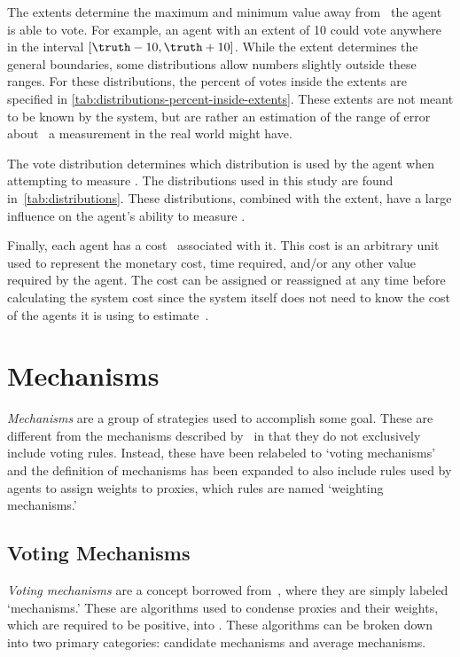 The extents determine the maximum and minimum value away from \truth\ the
agent is able to vote.
For example, an agent with an extent of 10 could vote anywhere in the
interval $[\truth - 10, \truth + 10]$.
While the extent determines the general boundaries, some distributions allow
numbers slightly outside these ranges.
For these distributions, the percent of votes inside the extents are
specified in \autoref{tab:distributions-percent-inside-extents}.
These extents are not meant to be known by the system, but are rather an
estimation of the range of error about \truth\ a measurement in the real world
might have.

The vote distribution determines which distribution is used by the agent when
attempting to measure \truth.
The distributions used in this study are found
in~\autoref{tab:distributions}.
These distributions, combined with the extent, have a large influence on the
agent's ability to measure \truth.

Finally, each agent has a cost \agentcost\ associated with it.
This cost is an arbitrary unit used to represent the monetary cost, time
required, and/or any other value required by the agent.
The cost can be assigned or reassigned at any time before calculating the
system cost since the system itself does not need to know the cost of the
agents it is using to estimate~\truth.



\section{Mechanisms}\label{sec:mechanisms}
\textit{Mechanisms} are a group of strategies used to accomplish some goal.
These are different from the mechanisms described by~\cite{Cohensius2017} in
that they do not exclusively include voting rules.
Instead, these have been relabeled to `voting mechanisms' and the definition
of mechanisms has been expanded to also include rules used by agents to
assign weights to proxies, which rules are named `weighting mechanisms.'

\subsection{Voting Mechanisms}\label{subsec:voting-mechanisms}
\textit{Voting mechanisms} are a concept borrowed from~\cite{Cohensius2017},
where they are simply labeled `mechanisms.'
These are algorithms used to condense proxies and their weights, which are
required to be positive, into \systemtruth.
These algorithms can be broken down into two primary categories: candidate
mechanisms and average mechanisms.

